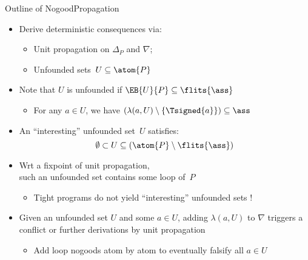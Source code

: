 \begin{frame}{Outline of {NogoodPropagation}}
\begin{itemize}
\item Derive deterministic consequences via:
  \begin{itemize}
  \item Unit propagation on $\Delta_P$ and $\nabla$;
  \item Unfounded sets~$U\subseteq\atom{P}$
  \end{itemize}
\item Note that $U$ is \alert{unfounded} if $\EB{U}{P}\subseteq\flits{\ass}$
  \begin{itemize}
  \item {} For any $a\in U$, we have $(\lambda(a,U)\setminus\{\Tsigned{a}\})\subseteq\ass$
  \end{itemize}
\pause
\item An ``interesting'' unfounded set~$U$ satisfies:
\[
  \emptyset\subset U \subseteq (\atom{P}\setminus\flits{\ass})
\]
\item Wrt a fixpoint of unit propagation,\\
\pause
      such an unfounded set contains some loop of~$P$
  \begin{itemize}
  \item {} Tight programs do not yield ``interesting'' unfounded sets !
  \end{itemize}
\pause
\item Given an unfounded set $U$ and some $a\in U$,
      adding $\lambda(a,U)$ to $\nabla$ triggers a conflict or
      further derivations by unit propagation
  \begin{itemize}
  \item {} Add loop nogoods atom by atom to eventually falsify all $a\in U$
  \end{itemize}
\end{itemize}
\end{frame}
\begin{frame}[c]
\SetAlFnt{\tiny}

\end{frame}
